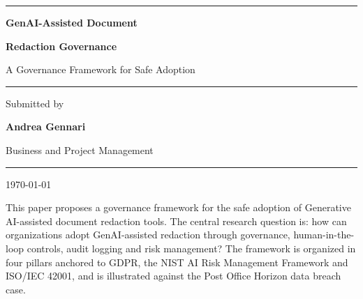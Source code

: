 \documentclass[12pt,a4paper]{article}
\begin{document}
\begin{titlepage}
    \centering
    \vspace*{3cm}

    {\color{accentdark}\rule{\textwidth}{1.5pt}}

    \vspace{1.2cm}
    {\Huge\bfseries\color{accentdark} GenAI-Assisted Document\par}
    \vspace{0.3cm}
    {\Huge\bfseries\color{accentdark} Redaction Governance\par}
    \vspace{0.8cm}
    {\Large\color{accentdark!80!black} A Governance Framework for Safe Adoption\par}
    \vspace{1.2cm}

    {\color{accentdark}\rule{0.4\textwidth}{0.8pt}}

    \vspace{2cm}
    {\large\color{accentdark!70!black} Submitted by\par}
    \vspace{0.3cm}
    {\LARGE\bfseries\color{accentdark} Andrea Gennari\par}
    \vspace{0.5cm}
    {\normalsize\color{accentdark!70!black} Business and Project Management\par}
    \vfill
    {\color{accentdark}\rule{\textwidth}{1.5pt}}
    \vspace{0.5cm}
    {\large\color{accentdark!70!black} \today\par}
\end{titlepage}

\thispagestyle{empty}
\vspace*{2cm}
\begin{tcolorbox}[
  enhanced,
  colback=accentlight!30!white,
  colframe=accentdark,
  coltitle=white,
  fonttitle=\bfseries\large,
  title=Abstract,
  attach boxed title to top center={yshift=-3mm},
  boxed title style={colback=accentdark, arc=3pt, boxrule=0pt},
  arc=3pt,
  boxrule=0.8pt,
  left=12pt, right=12pt, top=10pt, bottom=10pt,
]
This paper proposes a governance framework for the safe adoption of Generative AI-assisted document redaction tools. The central research question is: how can organizations adopt GenAI-assisted redaction through governance, human-in-the-loop controls, audit logging and risk management? The framework is organized in four pillars anchored to GDPR, the NIST AI Risk Management Framework and ISO/IEC 42001, and is illustrated against the Post Office Horizon data breach case.
\end{tcolorbox}
\end{document}
